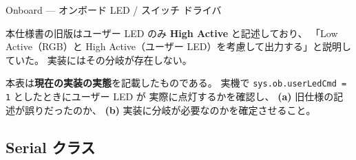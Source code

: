 \documentclass[a4paper,11pt,dvipdfmx]{jsarticle}
\begin{document}
\begin{apibox}{Onboard --- オンボード LED / スイッチ ドライバ}
\begin{cautionbox}
本仕様書の旧版はユーザー LED のみ \textbf{High Active} と記述しており、
「Low Active（RGB）と High Active（ユーザー LED）を考慮して出力する」と説明していた。
実装にはその分岐が存在しない。

本表は\textbf{現在の実装の実態}を記載したものである。
実機で \texttt{sys.ob.userLedCmd = 1} としたときにユーザー LED が
実際に点灯するかを確認し、
\textbf{(a)} 旧仕様の記述が誤りだったのか、
\textbf{(b)} 実装に分岐が必要なのかを確定させること。
\end{cautionbox}

\end{apibox}

\subsection{Serial クラス}\label{sec:api-serial}
\end{document}
